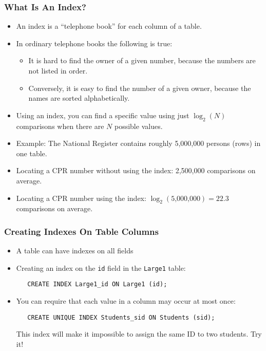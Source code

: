 \documentclass[dvipsnames]{beamer}
\begin{document}
\begin{frame}
\frametitle{What Is An Index?}

\begin{itemize}
\item An index is a ``telephone book'' for each column of a table.


\item In ordinary telephone books the following is true:

  \begin{itemize}
  \item It is hard to find the owner of a given number, because the
    numbers are not listed in order.

  \item Conversely, it is easy to find the number of a given owner,
    because the names are sorted alphabetically. 
  \end{itemize}


\item Using an index, you can find a specific value using just $\log_2(N)$
  comparisons when there are $N$ possible values.


\item Example: The National Register contains roughly 5,000,000
  persons (rows) in one table.


\item Locating a CPR number without using the index: 2,500,000 comparisons
  on average.


\item Locating a CPR number using the index: $\log_2(\mbox{5,000,000}) = 22.3$
  comparisons on average.
\end{itemize}
\end{frame}


\begin{frame}[fragile=singleslide]
\frametitle{Creating Indexes On Table Columns}

\begin{itemize}  
\item A table can have indexes on all fields
\item Creating an index on the \texttt{id} field in the
  \texttt{Large1} table:

\begin{small}
\begin{verbatim}
   CREATE INDEX Large1_id ON Large1 (id);
\end{verbatim}
\end{small}
    
\item You can require that each value in a column may occur at most once:

\begin{small}
\begin{verbatim}
   CREATE UNIQUE INDEX Students_sid ON Students (sid);
\end{verbatim}
\end{small}

This index will make it impossible to assign the same ID to two
students.  Try it!

\end{itemize}
\end{frame}
\end{document}
